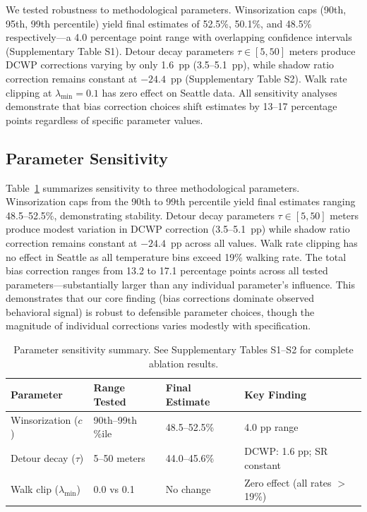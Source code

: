 We tested robustness to methodological parameters. Winsorization caps (90th, 95th, 99th percentile) yield final estimates of 52.5\%, 50.1\%, and 48.5\% respectively---a 4.0 percentage point range with overlapping confidence intervals (Supplementary Table S1). Detour decay parameters $\tau \in [5, 50]$ meters produce DCWP corrections varying by only 1.6~pp (3.5--5.1~pp), while shadow ratio correction remains constant at $-24.4$~pp (Supplementary Table S2). Walk rate clipping at $\lambda_{\text{min}} = 0.1$ has zero effect on Seattle data. All sensitivity analyses demonstrate that bias correction choices shift estimates by 13--17 percentage points regardless of specific parameter values.



\subsection{Parameter Sensitivity}

Table~\ref{tab:sensitivity-summary} summarizes sensitivity to three methodological parameters. Winsorization caps from the 90th to 99th percentile yield final estimates ranging 48.5--52.5\%, demonstrating stability. Detour decay parameters $\tau \in [5, 50]$ meters produce modest variation in DCWP correction (3.5--5.1~pp) while shadow ratio correction remains constant at $-24.4$~pp across all values. Walk rate clipping has no effect in Seattle as all temperature bins exceed 19\% walking rate. The total bias correction ranges from 13.2 to 17.1 percentage points across all tested parameters---substantially larger than any individual parameter's influence. This demonstrates that our core finding (bias corrections dominate observed behavioral signal) is robust to defensible parameter choices, though the magnitude of individual corrections varies modestly with specification.

\begin{table}[t]
\centering
\caption{Parameter sensitivity summary. See Supplementary Tables S1--S2 for complete ablation results.}
\label{tab:sensitivity-summary}
\small
\begin{tabular}{@{}llll@{}}
\toprule
\textbf{Parameter} & \textbf{Range Tested} & \textbf{Final Estimate} & \textbf{Key Finding} \\
\midrule
Winsorization ($c$) & 90th--99th \%ile & 48.5--52.5\% & 4.0 pp range \\
Detour decay ($\tau$) & 5--50 meters & 44.0--45.6\% & DCWP: 1.6 pp; SR constant \\
Walk clip ($\lambda_{\text{min}}$) & 0.0 vs 0.1 & No change & Zero effect (all rates $>$19\%) \\
\bottomrule
\end{tabular}
\end{table}


